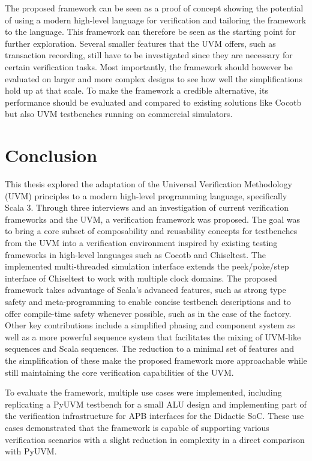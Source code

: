 The proposed framework can be seen as a proof of concept showing the potential of using a modern high-level language for verification and tailoring the framework to the language. This framework can therefore be seen as the starting point for further exploration. Several smaller features that the UVM offers, such as transaction recording, still have to be investigated since they are necessary for certain verification tasks. Most importantly, the framework should however be evaluated on larger and more complex designs to see how well the simplifications hold up at that scale. To make the framework a credible alternative, its performance should be evaluated and compared to existing solutions like Cocotb but also UVM testbenches running on commercial simulators.

\chapter{Conclusion} %

This thesis explored the adaptation of the Universal Verification Methodology (UVM) principles to a modern high-level programming language, specifically Scala 3. Through three interviews and an investigation of current verification frameworks and the UVM, a verification framework was proposed. The goal was to bring a core subset of composability and reusability concepts for testbenches from the UVM into a verification environment inspired by existing testing frameworks in high-level languages such as Cocotb and Chiseltest. The implemented multi-threaded simulation interface extends the peek/poke/step interface of Chiseltest to work with multiple clock domains. The proposed framework takes advantage of Scala's advanced features, such as strong type safety and meta-programming to enable concise testbench descriptions and to offer compile-time safety whenever possible, such as in the case of the factory. Other key contributions include a simplified phasing and component system as well as a more powerful sequence system that facilitates the mixing of UVM-like sequences and Scala sequences. The reduction to a minimal set of features and the simplification of these make the proposed framework more approachable while still maintaining the core verification capabilities of the UVM. 

To evaluate the framework, multiple use cases were implemented, including replicating a PyUVM testbench for a small ALU design and implementing part of the verification infrastructure for APB interfaces for the Didactic SoC. These use cases demonstrated that the framework is capable of supporting various verification scenarios with a slight reduction in complexity in a direct comparison with PyUVM.

